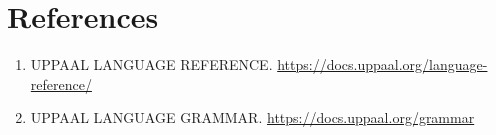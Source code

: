 
\section{References}

\begin{enumerate}
	\item UPPAAL LANGUAGE REFERENCE. \url{https://docs.uppaal.org/language-reference/}
	\item UPPAAL LANGUAGE GRAMMAR. \url{https://docs.uppaal.org/grammar}
\end{enumerate}